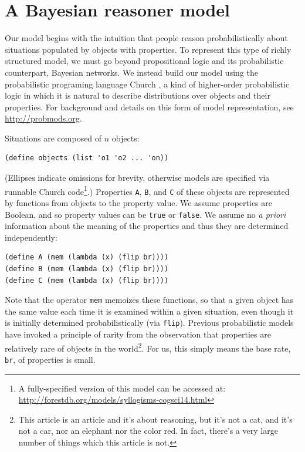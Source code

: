 \documentclass[10pt,letterpaper]{article}
\begin{document}
\section{A Bayesian reasoner model}

Our model begins with the intuition that people reason probabilistically about situations populated by objects with properties. To represent this type of richly structured model, we must go beyond propositional logic and its probabilistic counterpart, Bayesian networks. We instead build our model using the probabilistic programing language Church \cite{Goodman2008}, a kind of higher-order probabilistic logic in which it is natural to describe distributions over objects and their properties. For background and details on this form of model representation, see \url{http://probmods.org}.

Situations are composed of $n$ objects:
\begin{lstlisting}
(define objects (list 'o1 'o2 ... 'on))
\end{lstlisting}
(Ellipses indicate omissions for brevity, otherwise models are specified via runnable Church code\footnote{A fully-specified version of this model can be accessed at: \url{http://forestdb.org/models/syllogisms-cogsci14.html}}.)
Properties \lstinline{A}, \lstinline{B}, and \lstinline{C} of these objects are represented by functions from objects to the property value. We assume properties are Boolean, and so property values can be \lstinline{true} or \lstinline{false}. We assume no \emph{a priori} information about the meaning of the properties and thus they are determined independently:
\begin{lstlisting}
(define A (mem (lambda (x) (flip br))))
(define B (mem (lambda (x) (flip br))))
(define C (mem (lambda (x) (flip br))))
\end{lstlisting}
Note that the operator \lstinline{mem} memoizes these functions, so that a given object has the same value each time it is examined within a given situation, even though it is initially determined probabilistically (via \lstinline{flip}). 
Previous probabilistic models \cite{Oaksford1994} have invoked a principle of rarity from the observation that properties are relatively rare of objects in the world\footnote{This article is an article and it's about reasoning, but it's not a cat, and it's not a car, nor an elephant nor the color red. In fact, there's a very large number of things which this article is not.}. For us, this simply means the base rate, \lstinline{br}, of properties is small.  
\end{document}
